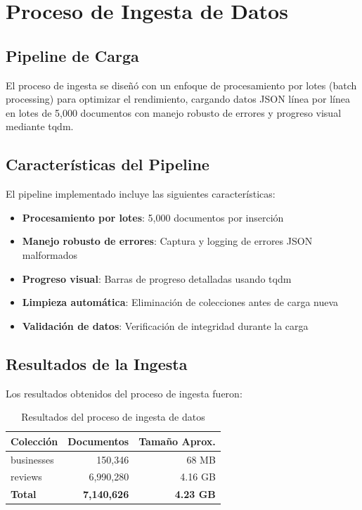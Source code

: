 \documentclass[12pt,a4paper,twoside,openany]{book}
\begin{document}
\section{Proceso de Ingesta de Datos}

\subsection{Pipeline de Carga}

El proceso de ingesta se diseñó con un enfoque de procesamiento por lotes (batch processing) para optimizar el rendimiento, cargando datos JSON línea por línea en lotes de 5,000 documentos con manejo robusto de errores y progreso visual mediante tqdm.

\subsection{Características del Pipeline}

El pipeline implementado incluye las siguientes características:

\begin{itemize}
    \item \textbf{Procesamiento por lotes}: 5,000 documentos por inserción
    \item \textbf{Manejo robusto de errores}: Captura y logging de errores JSON malformados
    \item \textbf{Progreso visual}: Barras de progreso detalladas usando tqdm
    \item \textbf{Limpieza automática}: Eliminación de colecciones antes de carga nueva
    \item \textbf{Validación de datos}: Verificación de integridad durante la carga
\end{itemize}

\subsection{Resultados de la Ingesta}

Los resultados obtenidos del proceso de ingesta fueron:

\begin{table}[H]
\centering
\caption{Resultados del proceso de ingesta de datos}
\begin{tabular}{@{}lrr@{}}
\toprule
\textbf{Colección} & \textbf{Documentos} & \textbf{Tamaño Aprox.} \\
\midrule
businesses & 150,346 & 68 MB \\
reviews & 6,990,280 & 4.16 GB \\
\textbf{Total} & \textbf{7,140,626} & \textbf{4.23 GB} \\
\bottomrule
\end{tabular}
\end{table}
\end{document}
